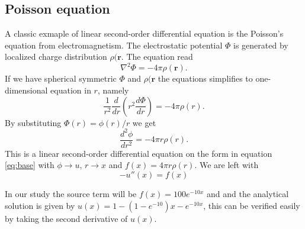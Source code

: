 \documentclass[10pt, a4paper]{amsart}
\begin{document}
\subsection{Poisson equation}
A classic exmaple of linear second-order differential equation is the Poisson's equation from electromagnetism. The electrostatic potential $\Phi$ is generated by localized charge distribution $\rho(\mathbf{r}.$ The equation read 
\begin{equation}
	\nabla^2\Phi = -4\pi\rho(\mathbf{r})\nonumber.
\end{equation}
If we have spherical symmetric $\Phi$ and $\rho(\mathbf{r}$ the equations simplifies to one-dimensional equation in $r$, namely 
\begin{equation}
	\frac{1}{r^2}\frac{d}{dr}\left( r^2\frac{d\Phi}{dr}\right) = -4\pi\rho(r).	\nonumber
\end{equation}
By substituting $\Phi(r) = \phi(r)/r$ we get 
\begin{equation}
	\frac{d^2\phi}{dr^2} = -4\pi r\rho(r).\nonumber
\end{equation}
This is a linear second-order differential equation on the form in equation \ref{eq:base} with $\phi \rightarrow u$, $r \rightarrow x$ and $f(x) = 4\pi r\rho(r)$. We are left with
\begin{equation}
	-u''(x) = f(x)\nonumber
\end{equation}

In our study the source term will be $f(x) = 100e^{-10x}$ and and the analytical solution is given by $u(x) = 1-(1-e^{-10})x-e^{-10x}$, this can be verified easily by taking the second derivative of $u(x)$.
\end{document}
